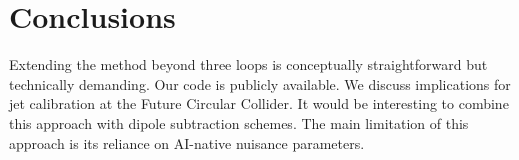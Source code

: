 \section{Conclusions}\label{sec:conclusions}

Extending the method beyond three loops is conceptually straightforward
but technically demanding. Our code is publicly available. We discuss
implications for jet calibration at the Future Circular Collider. It
would be interesting to combine this approach with dipole subtraction
schemes. The main limitation of this approach is its reliance on
AI-native nuisance parameters.

